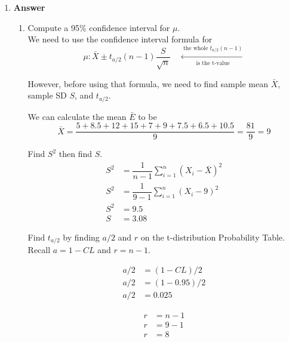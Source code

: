 \documentclass[12pt]{book}
\begin{document}
\begin{enumerate}
    \newpage
    \item \textbf{Answer}
    
    
    
    
    \begin{enumerate}
        \item Compute a 95\% confidence interval for $\mu$.\\
        
        We need to use the confidence interval formula for $$\mu : \bar{X} \pm t_{a/2}(n-1)\dfrac{S}{\sqrt{n}} \quad \xleftarrow[\text{ is the t-value}]{\text{ the whole } t_{a/2}(n-1)}$$
        
        However, before using that formula, we need to find sample mean $\bar{X}$, sample SD $S$, and $t_{a/2}$.
        
        We can calculate the mean $\bar{E}$ to be
        $$\bar{X} = \dfrac{5 + 8.5 + 12 + 15 + 7 + 9 + 7.5 + 6.5 + 10.5}{9} = \dfrac{81}{9} = 9$$
        
        Find $S^2$ then find $S$.
        \begin{align*}
            S^2 &= \dfrac{1}{n-1} \sum^{n}_{i=1}\left( X_i - \bar{X} \right)^2\\
            S^2 &= \dfrac{1}{9-1} \sum^{n}_{i=1}\left( X_i - 9 \right)^2\\
            S^2 &= 9.5\\
            S &= 3.08
        \end{align*}
        
        Find $t_{a/2}$ by finding $a/2$ and $r$ on the t-distribution Probability Table. Recall $a = 1-CL$ and $r = n-1$.\\
        \begin{minipage}{0.45\textwidth}
            \begin{align*}
                a/2 &= (1-CL)/2\\
                a/2 &= (1-0.95)/2\\
                a/2 &= 0.025
            \end{align*}
        \end{minipage}
        \begin{minipage}{0.45\textwidth}
            \begin{align*}
                r &= n -1\\
                r &= 9 - 1\\
                r &= 8
            \end{align*}
        \end{minipage}\\
        

\end{enumerate}
\end{enumerate}
\end{document}
